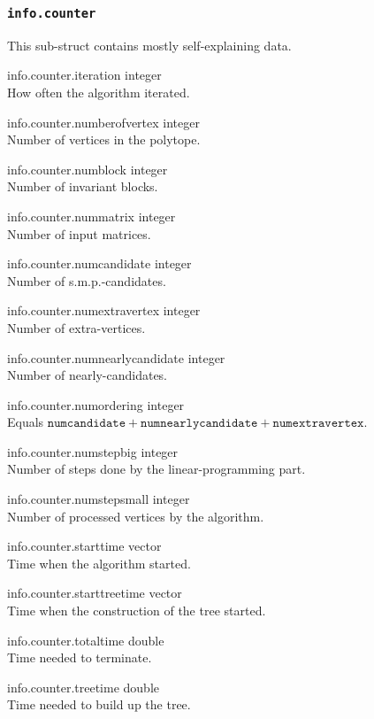 \subsubsection{\texttt{info.counter}} This sub-struct contains mostly self-explaining data.
\begin{param}
\item[info.counter.iteration] integer\\How often the algorithm iterated.
\item[info.counter.numberofvertex] integer\\Number of vertices in the polytope.
\item[info.counter.numblock] integer\\Number of invariant blocks.
\item[info.counter.nummatrix] integer\\Number of input matrices.
\item[info.counter.numcandidate] integer\\Number of s.m.p.-candidates.
\item[info.counter.numextravertex] integer\\Number of extra-vertices.
\item[info.counter.numnearlycandidate] integer\\Number of nearly-candidates.
\item[info.counter.numordering] integer\\Equals $\texttt{numcandidate}+\texttt{numnearlycandidate}+\texttt{numextravertex}$.
\item[info.counter.numstepbig] integer\\Number of steps done by the linear-programming part.
\item[info.counter.numstepsmall] integer\\Number of processed vertices by the algorithm.
\item[info.counter.starttime] vector\\Time when the algorithm started.
\item[info.counter.starttreetime] vector\\Time when the construction of the tree started.
\item[info.counter.totaltime] double\\Time needed to terminate.
\item[info.counter.treetime] double\\Time needed to build up the tree.
\end{param}

